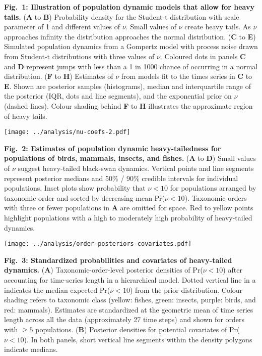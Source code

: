 \textbf{Fig.~1: Illustration of population dynamic models that allow for heavy tails.} (\textbf{A} to \textbf{B}) Probability density for the Student-t distribution with scale parameter of 1 and different values of \(\nu\). Small values of \(\nu\) create heavy tails. As \(\nu\) approaches infinity the distribution approaches the normal distribution. (\textbf{C} to \textbf{E}) Simulated population dynamics from a Gompertz model with process noise drawn from Student-t distributions with three values of \(\nu\). Coloured dots in panels \textbf{C} and \textbf{D} represent jumps with less than a 1 in 1000 chance of occurring in a normal distribution. (\textbf{F} to \textbf{H}) Estimates of \(\nu\) from models fit to the times series in \textbf{C} to \textbf{E}. Shown are posterior samples (histograms), median and interquartile range of the posterior (IQR, dots and line segments), and the exponential prior on \(\nu\) (dashed lines). Colour shading behind \textbf{F} to \textbf{H} illustrates the approximate region of heavy tails.

\clearpage

\begin{center}
\texttt{[image: ../analysis/nu-coefs-2.pdf]}
\end{center}

\textbf{Fig.~2: Estimates of population dynamic heavy-tailedness for populations of birds, mammals, insects, and fishes.} (\textbf{A} to \textbf{D}) Small values of \(\nu\) suggest heavy-tailed black-swan dynamics. Vertical points and line segments represent posterior medians and 50\% / 90\% credible intervals for individual populations. Inset plots show probability that \(\nu < 10\) for populations arranged by taxonomic order and sorted by decreasing mean Pr(\(\nu < 10\)). Taxonomic orders with three or fewer populations in \textbf{A} are omitted for space. Red to yellow points highlight populations with a high to moderately high probability of heavy-tailed dynamics.

\clearpage

\begin{center}
\texttt{[image: ../analysis/order-posteriors-covariates.pdf]}
\end{center}

\textbf{Fig.~3: Standardized probabilities and covariates of heavy-tailed dynamics.} (\textbf{A}) Taxonomic-order-level posterior densities of Pr(\(\nu < 10\)) after accounting for time-series length in a hierarchical model. Dotted vertical line in a indicates the median expected Pr(\(\nu < 10\)) from the prior distribution. Colour shading refers to taxonomic class (yellow: fishes, green: insects, purple: birds, and red: mammals). Estimates are standardized at the geometric mean of time series length across all the data (approximately 27 time steps) and shown for orders with \(\ge 5\) populations. (\textbf{B}) Posterior densities for potential covariates of Pr(\(\nu < 10\)). In both panels, short vertical line segments within the density polygons indicate medians.

